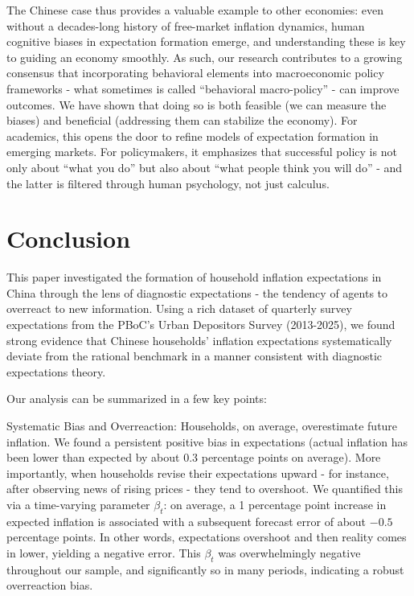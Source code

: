\documentclass[12pt]{article}
\begin{document}
The Chinese case thus provides a valuable example to other economies: even without a decades-long history of free-market inflation dynamics, human cognitive biases in expectation formation emerge, and understanding these is key to guiding an economy smoothly. As such, our research contributes to a growing consensus that incorporating behavioral elements into macroeconomic policy frameworks - what sometimes is called “behavioral macro-policy” - can improve outcomes. We have shown that doing so is both feasible (we can measure the biases) and beneficial (addressing them can stabilize the economy). For academics, this opens the door to refine models of expectation formation in emerging markets. For policymakers, it emphasizes that successful policy is not only about “what you do” but also about “what people think you will do” - and the latter is filtered through human psychology, not just calculus.

\section{Conclusion}
This paper investigated the formation of household inflation expectations in China through the lens of diagnostic expectations - the tendency of agents to overreact to new information. Using a rich dataset of quarterly survey expectations from the PBoC's Urban Depositors Survey (2013-2025), we found strong evidence that Chinese households' inflation expectations systematically deviate from the rational benchmark in a manner consistent with diagnostic expectations theory.

Our analysis can be summarized in a few key points:

Systematic Bias and Overreaction: Households, on average, overestimate future inflation. We found a persistent positive bias in expectations (actual inflation has been lower than expected by about 0.3 percentage points on average). More importantly, when households revise their expectations upward - for instance, after observing news of rising prices - they tend to overshoot. We quantified this via a time-varying parameter $\beta_t$: on average, a 1 percentage point increase in expected inflation is associated with a subsequent forecast error of about $-0.5$ percentage points. In other words, expectations overshoot and then reality comes in lower, yielding a negative error. This $\beta_t$ was overwhelmingly negative throughout our sample, and significantly so in many periods, indicating a robust overreaction bias.
\end{document}
